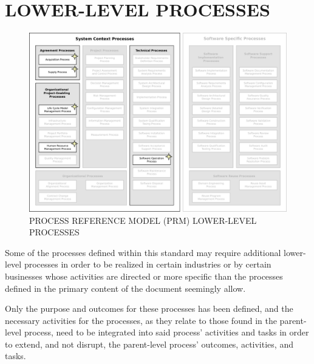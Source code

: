 \section{LOWER-LEVEL PROCESSES\label{app:lower_level_processes}}

\begin{figure}[h]
	\centering
	\includegraphics[width=15cm,keepaspectratio]{figures/life-cycle-process-groups-lower-level-processes.pdf}
	\caption{PROCESS REFERENCE MODEL (PRM) LOWER-LEVEL PROCESSES}
	\label{fig:lower_level_processes}
\end{figure}

\begin{adjustwidth}{1em}{0pt}

	Some of the processes defined within this standard may require additional lower-level processes in order to be realized in certain industries or by certain businesses whose activities are directed or more specific than the processes defined in the primary content of the document seemingly allow.

	Only the purpose and outcomes for these processes has been defined, and the necessary activities for the processes, as they relate to those found in the parent-level process, need to be integrated into said process' activities and tasks in order to extend, and not disrupt, the parent-level process' outcomes, activities, and tasks. 

\end{adjustwidth}

	\newpage
